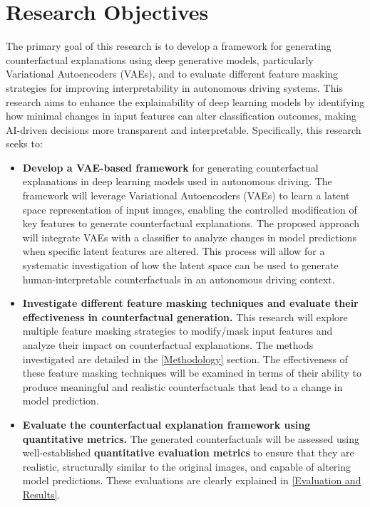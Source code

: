 \section{Research Objectives}
The primary goal of this research is to develop a framework for generating counterfactual explanations using deep generative models, particularly Variational Autoencoders (VAEs), and to evaluate different feature masking strategies for improving interpretability in autonomous driving systems. This research aims to enhance the explainability of deep learning models by identifying how minimal changes in input features can alter classification outcomes, making AI-driven decisions more transparent and interpretable. Specifically, this research seeks to:

\begin{itemize}
    \item \textbf{Develop a VAE-based framework} for generating counterfactual explanations in deep learning models used in autonomous driving.
    The framework will leverage Variational Autoencoders (VAEs) to learn a latent space representation of input images, enabling the controlled modification of key features to generate counterfactual explanations. The proposed approach will integrate VAEs with a classifier to analyze changes in model predictions when specific latent features are altered. This process will allow for a systematic investigation of how the latent space can be used to generate human-interpretable counterfactuals in an autonomous driving context.

    \item \textbf{Investigate different feature masking techniques and evaluate their effectiveness in counterfactual generation.}  
    This research will explore multiple feature masking strategies to modify/mask input features and analyze their impact on counterfactual explanations. The methods investigated are detailed in the \cref{Methodology} section. The effectiveness of these feature masking techniques will be examined in terms of their ability to produce meaningful and realistic counterfactuals that lead to a change in model prediction.
    
    \item \textbf{Evaluate the counterfactual explanation framework using quantitative metrics.}  
    The generated counterfactuals will be assessed using well-established \textbf{quantitative evaluation metrics} to ensure that they are realistic, structurally similar to the original images, and capable of altering model predictions. These evaluations are clearly explained in \cref{Evaluation and Results}.


\end{itemize}
